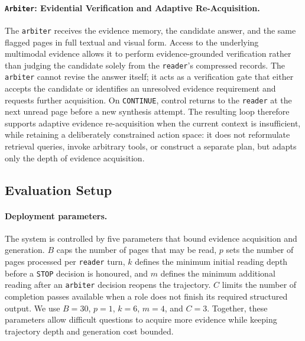 \documentclass[11pt,twoside,openany]{report}
\begin{document}
\paragraph{\texttt{Arbiter}: Evidential Verification and Adaptive Re-Acquisition.}
The \texttt{arbiter} receives the evidence memory, the candidate answer, and the same flagged pages in full textual and visual form. Access to the underlying multimodal evidence allows it to perform evidence-grounded verification rather than judging the candidate solely from the \texttt{reader}'s compressed records. The \texttt{arbiter} cannot revise the answer itself; it acts as a verification gate that either accepts the candidate or identifies an unresolved evidence requirement and requests further acquisition. On \texttt{CONTINUE}, control returns to the \texttt{reader} at the next unread page before a new synthesis attempt. The resulting loop therefore supports adaptive evidence re-acquisition when the current context is insufficient, while retaining a deliberately constrained action space: it does not reformulate retrieval queries, invoke arbitrary tools, or construct a separate plan, but adapts only the depth of evidence acquisition.

\subsection{Evaluation Setup}
\label{sec:simple_method_setup}

\paragraph{Deployment parameters.}
The system is controlled by five parameters that bound evidence acquisition and generation. \(B\) caps the number of pages that may be read, \(p\) sets the number of pages processed per \texttt{reader} turn, \(k\) defines the minimum initial reading depth before a \texttt{STOP} decision is honoured, and \(m\) defines the minimum additional reading after an \texttt{arbiter} decision reopens the trajectory. \(C\) limits the number of completion passes available when a role does not finish its required structured output. We use \(B=30\), \(p=1\), \(k=6\), \(m=4\), and \(C=3\). Together, these parameters allow difficult questions to acquire more evidence while keeping trajectory depth and generation cost bounded.
\end{document}
